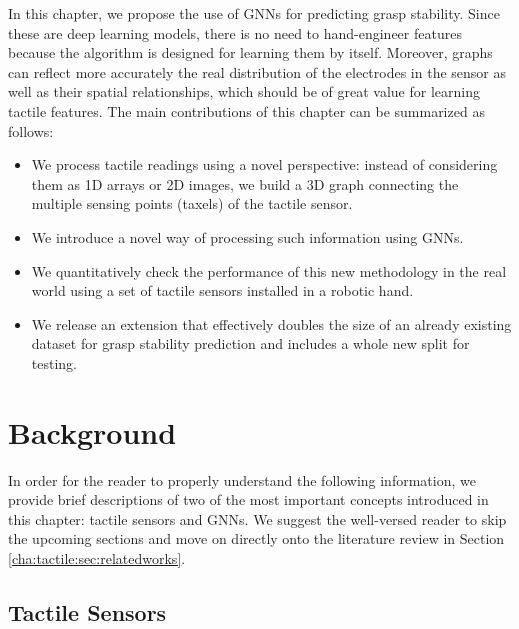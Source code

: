In this chapter, we propose the use of \acp{GNN} for predicting grasp stability. Since these are deep learning models, there is no need to hand-engineer features because the algorithm is designed for learning them by itself. Moreover, graphs can reflect more accurately the real distribution of the electrodes in the sensor as well as their spatial relationships, which should be of great value for learning tactile features. The main contributions of this chapter can be summarized as follows:

\begin{itemize}
	\item We process tactile readings using a novel perspective: instead of considering them as 1D arrays or 2D images, we build a 3D graph connecting the multiple sensing points (taxels) of the tactile sensor.

	\item We introduce a novel way of processing such information using \acfp{GNN}.
	
	\item We quantitatively check the performance of this new methodology in the real world using a set of tactile sensors installed in a robotic hand.

	\item We release an extension that effectively doubles the size of an already existing dataset \cite{Zapata2018} for grasp stability prediction and includes a whole new split for testing.
\end{itemize}

\clearpage

\section{Background}

In order for the reader to properly understand the following information, we provide brief descriptions of two of the most important concepts introduced in this chapter: tactile sensors and \aclp{GNN}. We suggest the well-versed reader to skip the upcoming sections and move on directly onto the literature review in Section \ref{cha:tactile:sec:relatedworks}.

\subsection{Tactile Sensors}

